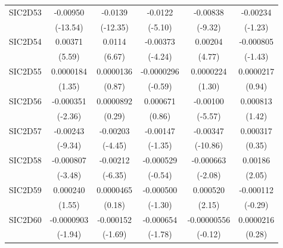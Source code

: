 \begin{table}[htbp]
\begin{tabular}{l*{5}{c}}
SIC2D53     &    -0.00950\sym{***}&     -0.0139\sym{***}&     -0.0122\sym{***}&    -0.00838\sym{***}&    -0.00234         \\
            &    (-13.54)         &    (-12.35)         &     (-5.10)         &     (-9.32)         &     (-1.23)         \\
SIC2D54     &     0.00371\sym{***}&      0.0114\sym{***}&    -0.00373\sym{***}&     0.00204\sym{***}&   -0.000805         \\
            &      (5.59)         &      (6.67)         &     (-4.24)         &      (4.77)         &     (-1.43)         \\
SIC2D55     &   0.0000184         &   0.0000136         &  -0.0000296         &   0.0000224         &   0.0000217         \\
            &      (1.35)         &      (0.87)         &     (-0.59)         &      (1.30)         &      (0.94)         \\
SIC2D56     &   -0.000351\sym{*}  &   0.0000892         &    0.000671         &    -0.00100\sym{***}&    0.000813         \\
            &     (-2.36)         &      (0.29)         &      (0.86)         &     (-5.57)         &      (1.42)         \\
SIC2D57     &    -0.00243\sym{***}&    -0.00203\sym{***}&    -0.00147         &    -0.00347\sym{***}&    0.000317         \\
            &     (-9.34)         &     (-4.45)         &     (-1.35)         &    (-10.86)         &      (0.35)         \\
SIC2D58     &   -0.000807\sym{***}&    -0.00212\sym{***}&   -0.000529         &   -0.000663\sym{*}  &     0.00186\sym{*}  \\
            &     (-3.48)         &     (-6.35)         &     (-0.54)         &     (-2.08)         &      (2.05)         \\
SIC2D59     &    0.000240         &   0.0000465         &   -0.000500         &    0.000520\sym{*}  &   -0.000112         \\
            &      (1.55)         &      (0.18)         &     (-1.30)         &      (2.15)         &     (-0.29)         \\
SIC2D60     &  -0.0000903         &   -0.000152         &   -0.000654         & -0.00000556         &   0.0000216         \\
            &     (-1.94)         &     (-1.69)         &     (-1.78)         &     (-0.12)         &      (0.28)         \\

\end{tabular}
\end{table}
